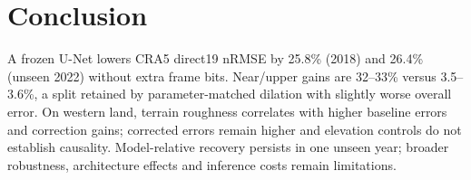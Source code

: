 \section{Conclusion}
\label{sec:conclusion}

A frozen U-Net lowers CRA5 direct19 nRMSE by 25.8\% (2018) and 26.4\%
(unseen 2022) without extra frame bits. Near/upper gains are 32--33\% versus
3.5--3.6\%, a split retained by parameter-matched dilation with slightly
worse overall error. On western land, terrain roughness correlates with
higher baseline errors and correction gains; corrected errors remain higher
and elevation controls do not establish causality. Model-relative recovery
persists in one unseen year; broader robustness, architecture effects and
inference costs remain limitations.
